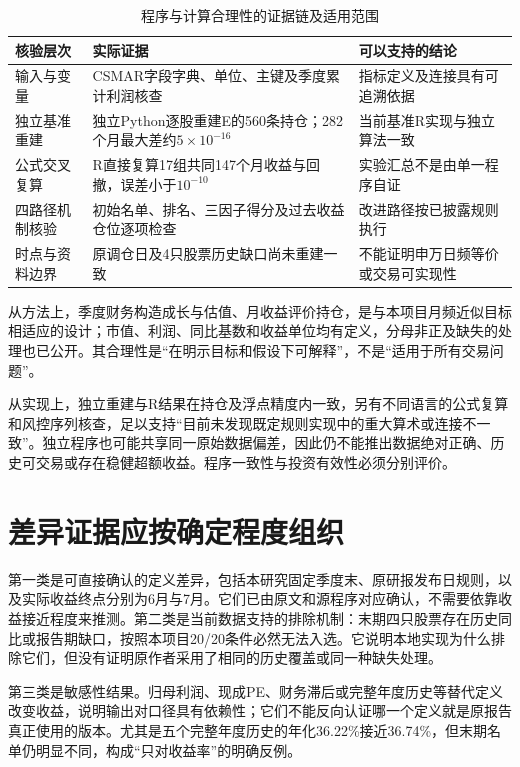 \begin{table}[htbp]
\centering
\caption{程序与计算合理性的证据链及适用范围}
\renewcommand{\arraystretch}{1.18}
\small
\setlength{\tabcolsep}{4.5pt}
\begin{tabularx}{\textwidth}{@{}p{2.35cm}LL@{}}
\toprule
核验层次 & 实际证据 & 可以支持的结论 \\
\midrule
输入与变量 & CSMAR字段字典、单位、主键及季度累计利润核查 & 指标定义及连接具有可追溯依据 \\
独立基准重建 & 独立Python逐股重建E的560条持仓；282个月最大差约$5\times10^{-16}$ & 当前基准R实现与独立算法一致 \\
公式交叉复算 & R直接复算17组共同147个月收益与回撤，误差小于$10^{-10}$ & 实验汇总不是由单一程序自证 \\
四路径机制核验 & 初始名单、排名、三因子得分及过去收益仓位逐项检查 & 改进路径按已披露规则执行 \\
时点与资料边界 & 原调仓日及4只股票历史缺口尚未重建一致 & 不能证明申万日频等价或交易可实现性 \\
\bottomrule
\end{tabularx}
\end{table}

从方法上，季度财务构造成长与估值、月收益评价持仓，是与本项目月频近似目标相适应的设计；市值、利润、同比基数和收益单位均有定义，分母非正及缺失的处理也已公开。其合理性是“在明示目标和假设下可解释”，不是“适用于所有交易问题”。

从实现上，独立重建与R结果在持仓及浮点精度内一致，另有不同语言的公式复算和风控序列核查，足以支持“目前未发现既定规则实现中的重大算术或连接不一致”。独立程序也可能共享同一原始数据偏差，因此仍不能推出数据绝对正确、历史可交易或存在稳健超额收益。程序一致性与投资有效性必须分别评价。

\section{差异证据应按确定程度组织}
第一类是可直接确认的定义差异，包括本研究固定季度末、原研报发布日规则，以及实际收益终点分别为6月与7月。它们已由原文和源程序对应确认，不需要依靠收益接近程度来推测。第二类是当前数据支持的排除机制：末期四只股票存在历史同比或报告期缺口，按照本项目20/20条件必然无法入选。它说明本地实现为什么排除它们，但没有证明原作者采用了相同的历史覆盖或同一种缺失处理。

第三类是敏感性结果。归母利润、现成PE、财务滞后或完整年度历史等替代定义改变收益，说明输出对口径具有依赖性；它们不能反向认证哪一个定义就是原报告真正使用的版本。尤其是五个完整年度历史的年化36.22\%接近36.74\%，但末期名单仍明显不同，构成“只对收益率”的明确反例。

